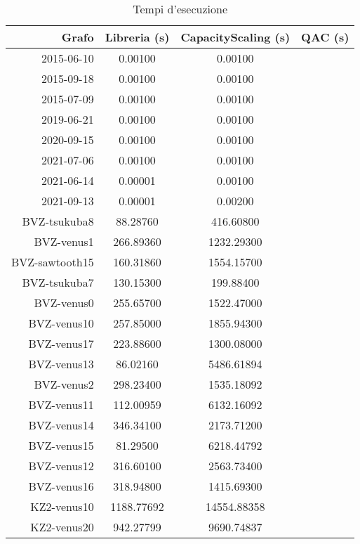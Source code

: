 \documentclass{article}
\begin{document}
\begin{table}
    \caption{Tempi d'esecuzione}\label{tabella_tempi}
    \centering
    \begin{tabular}{|r|c|c|c|}
    \hline
        Grafo & Libreria (s) & CapacityScaling (s) & QAC (s) \\ \hline
        2015-06-10 & 0.00100 & 0.00100 & \\ \hline
        2015-09-18 & 0.00100 & 0.00100 & \\ \hline
        2015-07-09 & 0.00100 & 0.00100 & \\ \hline
        2019-06-21 & 0.00100 & 0.00100 & \\ \hline
        2020-09-15 & 0.00100 & 0.00100 & \\ \hline
        2021-07-06 & 0.00100 & 0.00100 & \\ \hline
        2021-06-14 & 0.00001 & 0.00100 & \\ \hline
        2021-09-13 & 0.00001 & 0.00200 & \\ \hline\hline
        BVZ-tsukuba8 & 88.28760 & 416.60800 & \\ \hline
        BVZ-venus1 & 266.89360 & 1232.29300 & \\ \hline
        BVZ-sawtooth15 & 160.31860 & 1554.15700 & \\ \hline
        BVZ-tsukuba7 & 130.15300 & 199.88400 & \\ \hline
        BVZ-venus0 & 255.65700 & 1522.47000 & \\ \hline
        BVZ-venus10 & 257.85000 & 1855.94300 & \\ \hline
        BVZ-venus17 & 223.88600 & 1300.08000 & \\ \hline
        BVZ-venus13 & 86.02160 & 5486.61894 & \\ \hline
        BVZ-venus2 & 298.23400 & 1535.18092 & \\ \hline
        BVZ-venus11 & 112.00959 & 6132.16092 & \\ \hline
        BVZ-venus14 & 346.34100 & 2173.71200 & \\ \hline
        BVZ-venus15 & 81.29500 & 6218.44792 & \\ \hline
        BVZ-venus12 & 316.60100 & 2563.73400 & \\ \hline
        BVZ-venus16 & 318.94800 & 1415.69300 & \\ \hline
        KZ2-venus10 & 1188.77692 & 14554.88358 & \\ \hline
        KZ2-venus20 & 942.27799 & 9690.74837 & \\ \hline

\end{tabular}
\end{table}
\end{document}
